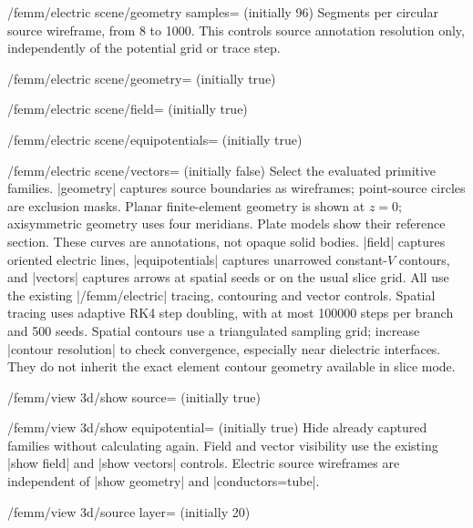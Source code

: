 \begin{key}{/femm/electric scene/geometry samples= (initially 96)}
Segments per circular source wireframe, from 8 to 1000. This controls source
annotation resolution only, independently of the potential grid or trace step.
\end{key}
\begin{key}{/femm/electric scene/geometry= (initially true)}
\end{key}
\begin{key}{/femm/electric scene/field= (initially true)}
\end{key}
\begin{key}{/femm/electric scene/equipotentials= (initially true)}
\end{key}
\begin{key}{/femm/electric scene/vectors= (initially false)}
Select the evaluated primitive families. |geometry| captures source boundaries
as wireframes; point-source circles are exclusion masks. Planar finite-element
geometry is shown at $z=0$; axisymmetric geometry uses four meridians. Plate
models show their reference section. These curves are annotations, not opaque
solid bodies. |field| captures oriented electric lines, |equipotentials| captures
unarrowed constant-$V$ contours, and |vectors| captures arrows at spatial seeds
or on the usual slice grid. All use the existing |/femm/electric| tracing,
contouring and vector controls. Spatial tracing uses adaptive RK4 step doubling,
with at most 100000 steps per branch and 500 seeds. Spatial contours use a
triangulated sampling grid; increase |contour resolution| to check convergence,
especially near dielectric interfaces. They do not inherit the exact element
contour geometry available in slice mode.
\end{key}
\begin{key}{/femm/view 3d/show source= (initially true)}
\end{key}
\begin{key}{/femm/view 3d/show equipotential= (initially true)}
Hide already captured families without calculating again. Field and vector
visibility use the existing |show field| and |show vectors| controls. Electric
source wireframes are independent of |show geometry| and |conductors=tube|.
\end{key}
\begin{key}{/femm/view 3d/source layer= (initially 20)}
\end{key}

